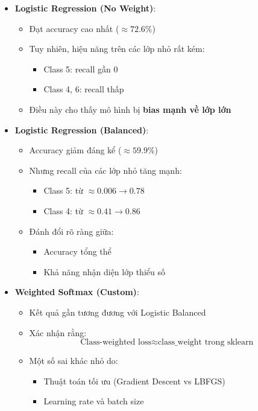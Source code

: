 \begin{itemize}
    \item \textbf{Logistic Regression (No Weight)}:
    \begin{itemize}
        \item Đạt accuracy cao nhất ($\approx 72.6\%$)
        \item Tuy nhiên, hiệu năng trên các lớp nhỏ rất kém:
        \begin{itemize}
            \item Class 5: recall gần 0
            \item Class 4, 6: recall thấp
        \end{itemize}
        \item Điều này cho thấy mô hình bị \textbf{bias mạnh về lớp lớn}
    \end{itemize}

    \item \textbf{Logistic Regression (Balanced)}:
    \begin{itemize}
        \item Accuracy giảm đáng kể ($\approx 59.9\%$)
        \item Nhưng recall của các lớp nhỏ tăng mạnh:
        \begin{itemize}
            \item Class 5: từ $\approx 0.006 \rightarrow 0.78$
            \item Class 4: từ $\approx 0.41 \rightarrow 0.86$
        \end{itemize}
        \item Đánh đổi rõ ràng giữa:
        \begin{itemize}
            \item Accuracy tổng thể
            \item Khả năng nhận diện lớp thiểu số
        \end{itemize}
    \end{itemize}

    \item \textbf{Weighted Softmax (Custom)}:
    \begin{itemize}
        \item Kết quả gần tương đương với Logistic Balanced
        \item Xác nhận rằng:
        \[
        \text{Class-weighted loss} \approx \text{class\_weight trong sklearn}
        \]
        \item Một số sai khác nhỏ do:
        \begin{itemize}
            \item Thuật toán tối ưu (Gradient Descent vs LBFGS)
            \item Learning rate và batch size
        \end{itemize}
    \end{itemize}
\end{itemize}

